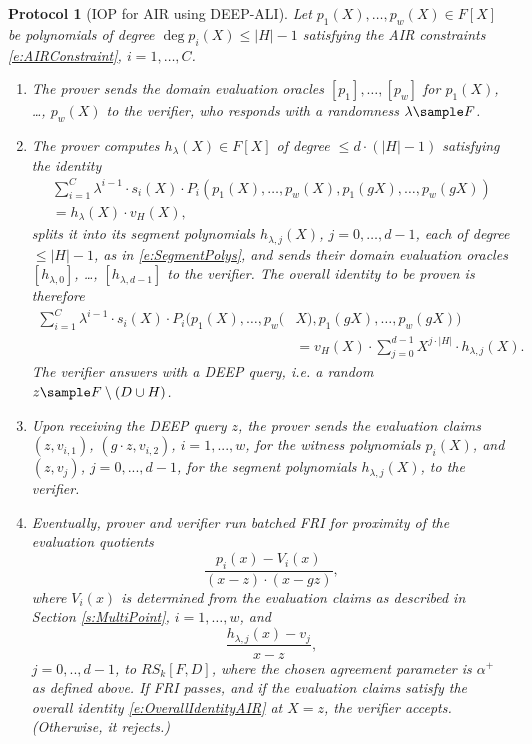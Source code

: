 \documentclass[11pt,article,oneside]{memoir}
\newtheorem{protocol}[]{Protocol}
\theoremstyle{definition}
\theoremstyle{remark}
\DeclareMathOperator{\Quotient}{\mathsf{Quotient}}
\begin{document}
\begin{protocol}[IOP for AIR using DEEP-ALI]
\label{p:DEEPAIR}
Let $p_1(X), \ldots, p_w(X)\in F[X]$ be polynomials of degree $\deg p_i(X)\leq |H|-1$ satisfying the AIR constraints \eqref{e:AIRConstraint}, $i=1,\ldots, C$.
\begin{enumerate}
\item
The prover sends the domain evaluation oracles  $[p_1], \ldots, [p_w]$ for $p_1(X)$, \ldots, $p_w(X)$ to the verifier, who responds with a randomness $\lambda\sample F$.
%
\item 
The prover computes $h_\lambda(X)\in F[X]$ of degree $\leq d \cdot (|H|-1)$ satisfying the identity
\begin{multline*}
\sum_{i=1}^{C} \lambda^{i-1}\cdot s_i(X)\cdot P_i(p_1(X),\ldots ,p_w(X),p_1(gX), \ldots, p_w(gX)) 
\\ 
= h_\lambda(X)\cdot v_H(X),
\end{multline*}
splits it into its segment polynomials $h_{\lambda, j}(X)$, $j=0,\ldots, d-1$, each of degree $\leq |H|-1$, as in \eqref{e:SegmentPolys}, and sends their domain evaluation oracles $[h_{\lambda,0}]$, \ldots, $[h_{\lambda,d - 1}]$ to the verifier.  
The overall identity to be proven is therefore
\begin{equation}
\label{e:OverallIdentityAIR}
\begin{aligned}
\sum_{i=1}^{C} \lambda^{i-1}\cdot s_i(X)\cdot P_i(p_1(X), \ldots, p_w(&X), p_1(gX), \ldots, p_w(gX))
\\ 
&= v_H(X)\cdot \sum_{j=0}^{d-1} X^{j\cdot |H|}\cdot  h_{\lambda,j}(X).
\end{aligned}
\end{equation}
The verifier answers with a DEEP query, i.e. a random $z\sample F\setminus (D\cup H)$.
%
\item 
Upon receiving the DEEP query $z$, the prover sends the evaluation claims $(z,v_{i,1})$, $(g\cdot z, v_{i,2})$, $i=1,...,w$, for the witness polynomials $p_i(X)$, and $(z,v_j)$, $j=0,...,d-1$, for the segment polynomials $h_{\lambda, j}(X)$, to the verifier.
\item
Eventually, prover and verifier run batched FRI for proximity of the evaluation quotients
\begin{equation*}
\frac{p_ i(x)- V_i(x)}{(x-z)\cdot (x-gz)},
\end{equation*}
where $V_i(x)$ is determined from the evaluation claims as described in Section \ref{s:MultiPoint},
 $i=1,\ldots,w$, and
\begin{equation*}
\frac{h_{\lambda,j}(x)-v_j}{x-z}, 
\end{equation*}
$j=0,..,d-1$, to $RS_k[F,D]$, where the chosen agreement parameter is $\alpha^+$ as defined above. 
If FRI passes, and if the evaluation claims satisfy the overall identity \eqref{e:OverallIdentityAIR} at $X=z$, the verifier accepts. 
(Otherwise, it rejects.)
\end{enumerate}
\end{protocol}
\end{document}
